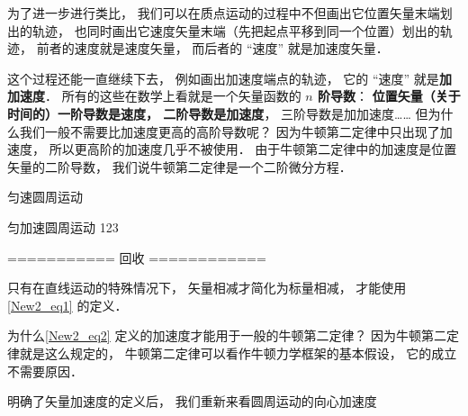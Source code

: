 为了进一步进行类比， 我们可以在质点运动的过程中不但画出它位置矢量末端划出的轨迹， 也同时画出它速度矢量末端（先把起点平移到同一个位置）划出的轨迹， 前者的速度就是速度矢量， 而后者的 “速度” 就是加速度矢量．

这个过程还能一直继续下去， 例如画出加速度端点的轨迹， 它的 “速度” 就是\textbf{加加速度}． 所有的这些在数学上看就是一个矢量函数的\textbf{ $n$ 阶导数}： \textbf{位置矢量（关于时间的）一阶导数是速度， 二阶导数是加速度}， 三阶导数是加加速度…… 但为什么我们一般不需要比加速度更高的高阶导数呢？ 因为牛顿第二定律中只出现了加速度， 所以更高阶的加速度几乎不被使用． 由于牛顿第二定律中的加速度是位置矢量的二阶导数， 我们说牛顿第二定律是一个二阶微分方程．

\begin{example}{匀速圆周运动}
\end{example}

\begin{example}{匀加速圆周运动}
123
\end{example}

=========== 回收 ============

只有在直线运动的特殊情况下， 矢量相减才简化为标量相减， 才能使用\autoref{New2_eq1} 的定义．

为什么\autoref{New2_eq2} 定义的加速度才能用于一般的牛顿第二定律？ 因为牛顿第二定律就是这么规定的， 牛顿第二定律可以看作牛顿力学框架的基本假设， 它的成立不需要原因．

明确了矢量加速度的定义后， 我们重新来看圆周运动的向心加速度


